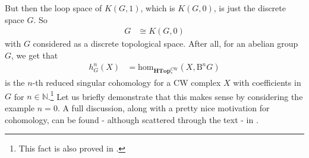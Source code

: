 But then the loop space of $K(G,1)$, which is $K(G,0)$, is just the discrete space $G$.
So
\begin{align*}
  G
  &\cong
  K(G,0)
\end{align*}
with $G$ considered as a discrete topological space.
After all, for an abelian group $G$, we get that
\begin{align*}
  h_{G}^{n}(X)
  &=
  \mathrm{hom}_{\mathbf{HTop}_{\ast}^{\textrm{CW}}}
  \left(
    X,
    \mathrm{B}^{n}G
  \right)
\end{align*}
is the $n$-th reduced singular cohomology for a CW complex $X$ with coefficients in $G$ for $n \in \mathbb{N}$.\footnote{This fact is also proved in \cite{8b5861fc}.} Let us briefly demonstrate that this makes sense by considering the example $n = 0$.
A full discussion, along with a pretty nice motivation for cohomology, can be found - although scattered through the text - in \cite{8b5861fc}.
